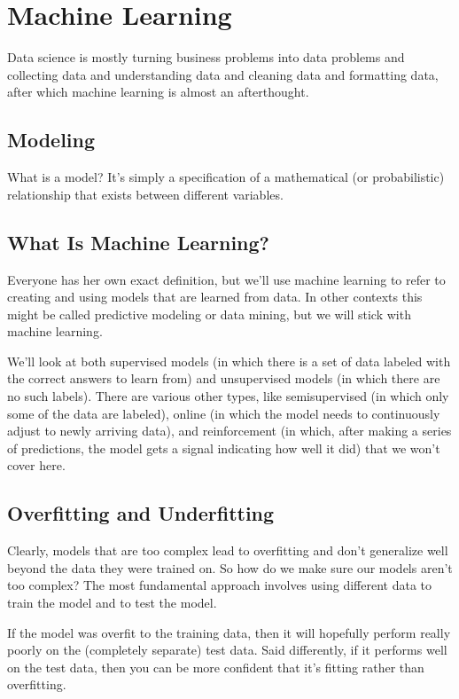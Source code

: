 \chapter{Machine Learning}
Data science is mostly turning business problems into data problems and collecting
data and understanding data and cleaning data and formatting data, after which
machine learning is almost an afterthought.
\section{Modeling}

What is a model? It's simply a specification of a mathematical (or probabilistic) relationship that exists between different variables.

\section{What Is Machine Learning?}

Everyone has her own exact definition, but we'll use machine learning to refer to creating and using models that are learned from data. In other contexts this might be
called predictive modeling or data mining, but we will stick with machine learning.

We'll look at both supervised models (in which there is a set of data labeled with the
correct answers to learn from) and unsupervised models (in which there are no such
labels). There are various other types, like semisupervised (in which only some of the
data are labeled), online (in which the model needs to continuously adjust to newly
arriving data), and reinforcement (in which, after making a series of predictions, the
model gets a signal indicating how well it did) that we won't cover here.

\section{Overfitting and Underfitting}

Clearly, models that are too complex lead to overfitting and don’t generalize well
beyond the data they were trained on. So how do we make sure our models aren’t too
complex? The most fundamental approach involves using different data to train the
model and to test the model.

If the model was overfit to the training data, then it will hopefully perform really
poorly on the (completely separate) test data. Said differently, if it performs well on
the test data, then you can be more confident that it’s fitting rather than overfitting.